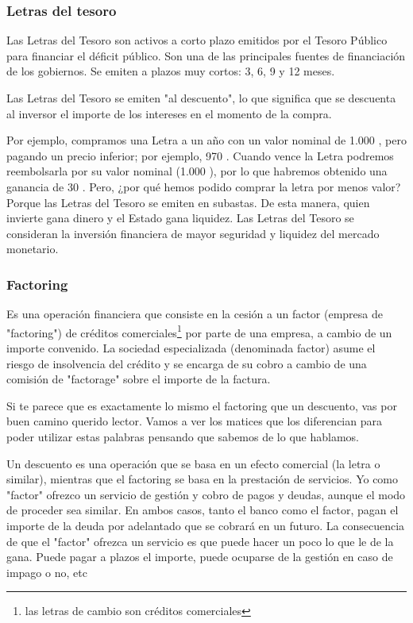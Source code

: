 \documentclass[nochap,palatino,shortheader]{apuntes}
\newcommand{\study}[1]{#1} \newcommand{\substudy}[1]{#1}
\begin{document}
\subsubsection{Letras del tesoro}
Las Letras del Tesoro son activos a corto plazo emitidos por el Tesoro Público para financiar el déficit público. Son una de las principales fuentes de financiación de los gobiernos.
Se emiten a plazos muy cortos: 3, 6, 9 y 12 meses.

Las Letras del Tesoro \study{se emiten "al descuento"}, lo que significa que se descuenta al inversor el importe de los intereses en el momento de la compra.

Por ejemplo, compramos una Letra a un año con un valor nominal de 1.000 \texteuro, pero pagando un precio inferior; por ejemplo, 970 \texteuro.
Cuando vence la Letra podremos reembolsarla por su valor nominal (1.000 \texteuro), por lo que habremos obtenido una ganancia de 30 \texteuro.
Pero, ¿por qué hemos podido comprar la letra por menos valor? Porque las Letras del Tesoro se emiten en subastas. De esta manera, quien invierte gana dinero y el Estado gana liquidez. \substudy{Las Letras del Tesoro se consideran la inversión financiera de mayor seguridad y liquidez del mercado monetario.}


\subsubsection{Factoring}

Es una operación financiera que consiste en la cesión a un factor (empresa de "factoring") de créditos comerciales\footnote{las letras de cambio son créditos comerciales} por parte de una empresa, a cambio de un importe convenido.
La sociedad especializada (denominada factor) asume el riesgo de insolvencia del crédito y se encarga de su cobro a cambio de una comisión de "factorage" sobre el importe de la factura.

Si te parece que es exactamente lo mismo el factoring que un descuento, vas por buen camino querido lector. Vamos a ver los matices que los diferencian para poder utilizar estas palabras pensando que sabemos de lo que hablamos.

Un descuento es una operación que se basa en un efecto comercial (la letra o similar), mientras que el \study{factoring} se basa en la \substudy{prestación de servicios}. Yo como "factor" ofrezco un servicio de gestión y cobro de pagos y deudas, aunque el modo de proceder sea similar. En ambos casos, tanto el banco como el factor, pagan el importe de la deuda por adelantado que se cobrará en un futuro. La consecuencia de que \substudy{el "factor"} ofrezca un servicio es que \substudy{puede hacer un poco lo que le de la gana}. Puede pagar a plazos el importe, puede ocuparse de la gestión en caso de impago o no, etc
\end{document}
